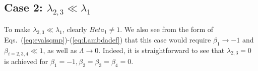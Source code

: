 \subsection{Case 2: $\lambda_{2,3}\ll \lambda_1$}
To make $\lambda_{2,3}\ll \lambda_1$, clearly $Beta_1 \neq 1$. We also see from the form of Eqs.~(\ref{eq:evalsqmp})-(\ref{eq:Lambdadef}) that this case would require $\beta_1\rightarrow -1$ and $\beta_{i=2,3,4}\ll 1$, as well as $\Lambda \rightarrow 0$.  Indeed, it is straightforward to see that $\lambda_{2,3}=0$ is achieved for $\beta_1=-1,\beta_2=\beta_3=\beta_4=0$. 





